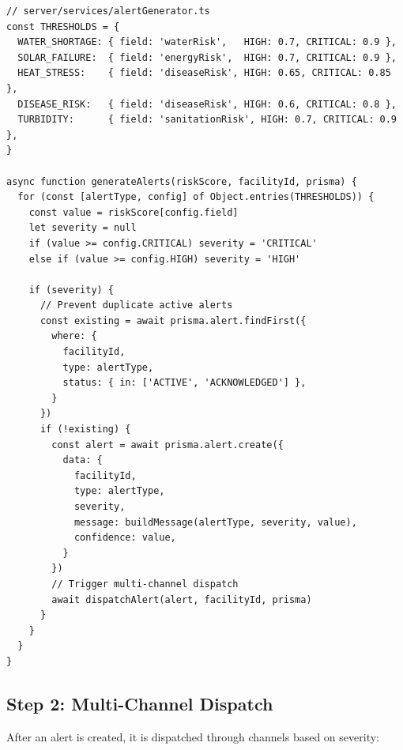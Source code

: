 \documentclass[12pt,a4paper]{report}
\begin{document}
\begin{lstlisting}[caption={Alert generation logic (added after risk score persistence)}]
// server/services/alertGenerator.ts
const THRESHOLDS = {
  WATER_SHORTAGE: { field: 'waterRisk',   HIGH: 0.7, CRITICAL: 0.9 },
  SOLAR_FAILURE:  { field: 'energyRisk',  HIGH: 0.7, CRITICAL: 0.9 },
  HEAT_STRESS:    { field: 'diseaseRisk', HIGH: 0.65, CRITICAL: 0.85 },
  DISEASE_RISK:   { field: 'diseaseRisk', HIGH: 0.6, CRITICAL: 0.8 },
  TURBIDITY:      { field: 'sanitationRisk', HIGH: 0.7, CRITICAL: 0.9 },
}

async function generateAlerts(riskScore, facilityId, prisma) {
  for (const [alertType, config] of Object.entries(THRESHOLDS)) {
    const value = riskScore[config.field]
    let severity = null
    if (value >= config.CRITICAL) severity = 'CRITICAL'
    else if (value >= config.HIGH) severity = 'HIGH'

    if (severity) {
      // Prevent duplicate active alerts
      const existing = await prisma.alert.findFirst({
        where: {
          facilityId,
          type: alertType,
          status: { in: ['ACTIVE', 'ACKNOWLEDGED'] },
        }
      })
      if (!existing) {
        const alert = await prisma.alert.create({
          data: {
            facilityId,
            type: alertType,
            severity,
            message: buildMessage(alertType, severity, value),
            confidence: value,
          }
        })
        // Trigger multi-channel dispatch
        await dispatchAlert(alert, facilityId, prisma)
      }
    }
  }
}
\end{lstlisting}

\subsection{Step 2: Multi-Channel Dispatch}

After an alert is created, it is dispatched through channels based on severity:
\end{document}
